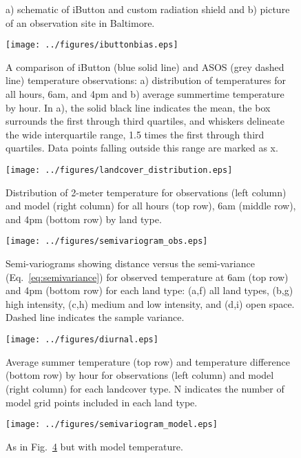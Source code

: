 \documentclass[draft,linenumbers]{agujournal}
\begin{document}
 \begin{figure}[h]
\centering
\caption{a) schematic of iButton and custom radiation shield and b) picture of an observation site in Baltimore.}
\label{fig:ibutton}
 \end{figure}
 
\begin{figure}[h]
\centering
\texttt{[image: ../figures/ibuttonbias.eps]}
\caption{A comparison of iButton (blue solid line) and ASOS (grey dashed line) temperature observations: a) distribution of temperatures for all hours,  6am, and 4pm and b) average summertime temperature by hour. In a), the solid black line indicates the mean, the box surrounds the first through third quartiles, and whiskers delineate the wide interquartile range, 1.5 times the first through third quartiles. Data points falling outside this range are marked as x. }
\label{fig:bias}
\end{figure}



\begin{figure}[h]
\centering
\texttt{[image: ../figures/landcover\_distribution.eps]}
\caption{Distribution of 2-meter temperature for observations (left column) and model (right column) for all hours (top row), 6am (middle row), and 4pm (bottom row) by land type. }
\label{fig:hist}
\end{figure}

\begin{figure}[h]
\centering
\texttt{[image: ../figures/semivariogram\_obs.eps]}
\caption{Semi-variograms showing distance versus the semi-variance (Eq.~\ref{eq:semivariance}) for observed temperature at 6am (top row) and 4pm (bottom row) for each land type: (a,f) all land types, (b,g) high intensity, (c,h) medium and low intensity, and (d,i) open space. Dashed line indicates the sample variance. 
}\label{fig:semiv_obs}

\end{figure}

\begin{figure}[h]
\centering
\texttt{[image: ../figures/diurnal.eps]}
\caption{Average summer temperature (top row) and temperature difference (bottom row) by hour for observations (left column) and model (right column) for each landcover type. N indicates the number of model grid points included in each land type. }
\label{fig:diurnal}
\end{figure}


\begin{figure}[h]
\centering
\texttt{[image: ../figures/semivariogram\_model.eps]}
\caption{As in Fig.~\ref{fig:semiv_obs} but with model temperature.}
\label{fig:semiv_model}
\end{figure}
\end{document}
